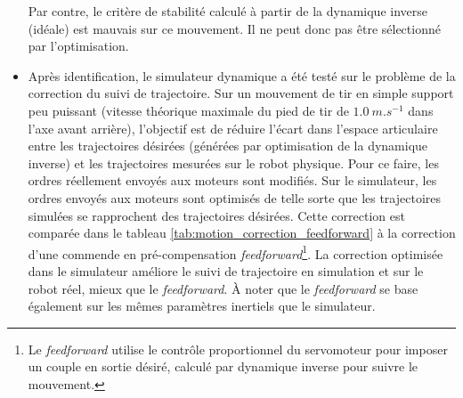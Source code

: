 \begin{itemize}
        Par contre, le critère de stabilité calculé à partir de la dynamique inverse (idéale)
        est mauvais sur ce mouvement. Il ne peut donc pas être sélectionné par l'optimisation.
    \item Après identification, le simulateur dynamique a été testé sur le
        problème de la correction du suivi de trajectoire.
        Sur un mouvement de tir en simple support peu puissant 
        (vitesse théorique maximale du pied de tir de $1.0~m.s^{-1}$ dans l'axe avant arrière),
        l'objectif est de réduire l'écart dans l'espace articulaire entre les trajectoires
        désirées (générées par optimisation de la dynamique inverse) et les trajectoires mesurées
        sur le robot physique.
        Pour ce faire, les ordres réellement envoyés aux moteurs sont modifiés.
        Sur le simulateur, les ordres envoyés aux moteurs sont optimisés de telle sorte que
        les trajectoires simulées se rapprochent des trajectoires désirées.
        Cette correction est comparée dans le tableau \ref{tab:motion_correction_feedforward}
        à la correction d'une commende en pré-compensation \textit{feedforward}\footnote{Le 
        \textit{feedforward} utilise le contrôle proportionnel du servomoteur 
        pour imposer un couple en sortie désiré, calculé par dynamique inverse 
        pour suivre le mouvement.}.
        La correction optimisée dans le simulateur améliore le suivi de trajectoire
        en simulation et sur le robot réel, mieux que le \textit{feedforward}.
        À noter que le \textit{feedforward} se base également sur les mêmes 
        paramètres inertiels que le simulateur.
\end{itemize}

